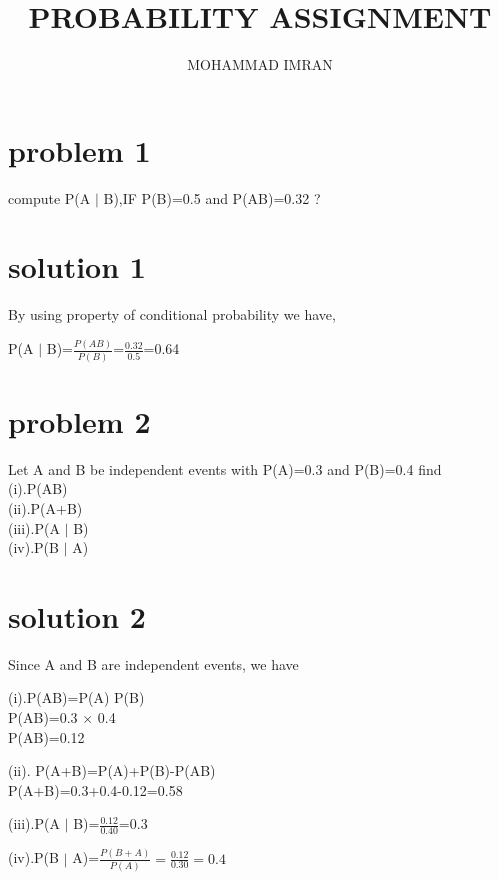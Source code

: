 \documentclass[journal,12pt,twocolumn]{article}
\title{PROBABILITY ASSIGNMENT}
\author{MOHAMMAD IMRAN}
\begin{document}
\maketitle
\tableofcontents
\bigskip

\section{problem 1}

compute P(A $\mid$ B),IF P(B)=0.5 and P(AB)=0.32 ?

\section{solution 1}

By using property of conditional probability we have,\\
\begin{center}
P(A $\mid$ B)=$\frac{P(AB)}{P(B)}$=$\frac{0.32}{0.5}$=0.64
\end{center}

\section{problem 2}

Let A and B be independent events with P(A)=0.3 and P(B)=0.4 find \\
(i).P(AB)\\
     (ii).P(A+B) \\
(iii).P(A $\mid$ B)   \\
       (iv).P(B $\mid$ A)
\section{solution 2}  


Since A and B are independent events, we have \\

\begin{center}
(i).P(AB)=P(A) P(B)\\
 \vspace{0.5cm}
P(AB)=0.3 $\times$ 0.4\\
 \vspace{0.5cm}
P(AB)=0.12

\end{center}
\begin{center}
(ii). P(A+B)=P(A)+P(B)-P(AB)\\
\vspace{0.5cm}
P(A+B)=0.3+0.4-0.12=0.58

\end{center}
\begin{center}
(iii).P(A $\mid$ B)=$\frac{0.12}{0.40}$=0.3
\end{center}
\begin{center}
(iv).P(B $\mid$ A)=$\frac{P(B+A)}{P(A)}=\frac{0.12}{0.30}=0.4$
\end{center}
 
\end{document}
